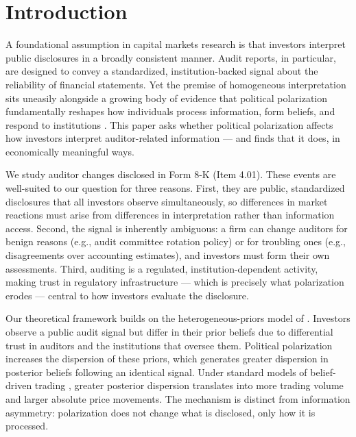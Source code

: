 
\section{Introduction}
\label{sec:intro}

A foundational assumption in capital markets research is that investors interpret
public disclosures in a broadly consistent manner. Audit reports, in particular,
are designed to convey a standardized, institution-backed signal about the
reliability of financial statements. Yet the premise of homogeneous interpretation
sits uneasily alongside a growing body of evidence that political polarization
fundamentally reshapes how individuals process information, form beliefs, and
respond to institutions \citep{kempf2024, bordalo2023}. This paper asks whether
political polarization affects how investors interpret auditor-related information
--- and finds that it does, in economically meaningful ways.

We study auditor changes disclosed in Form 8-K (Item 4.01). These events are
well-suited to our question for three reasons. First, they are public, standardized
disclosures that all investors observe simultaneously, so differences in market
reactions must arise from differences in interpretation rather than information
access. Second, the signal is inherently ambiguous: a firm can change auditors for
benign reasons (e.g., audit committee rotation policy) or for troubling ones (e.g.,
disagreements over accounting estimates), and investors must form their own
assessments. Third, auditing is a regulated, institution-dependent activity, making
trust in regulatory infrastructure --- which is precisely what polarization erodes
--- central to how investors evaluate the disclosure.

Our theoretical framework builds on the heterogeneous-priors model of
\citet{kandel1995}. Investors observe a public audit signal but differ in their
prior beliefs due to differential trust in auditors and the institutions that
oversee them. Political polarization increases the dispersion of these priors,
which generates greater dispersion in posterior beliefs following an identical
signal. Under standard models of belief-driven trading \citep{harris1993},
greater posterior dispersion translates into more trading volume and larger
absolute price movements. The mechanism is distinct from information asymmetry:
polarization does not change what is disclosed, only how it is processed.


